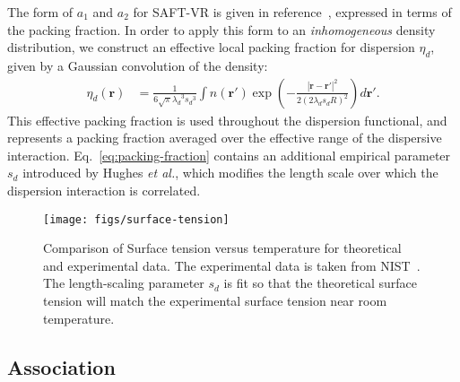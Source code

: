 \documentclass[twocolumn,amsmath,amssymb,prl]{revtex4-1}
\newcommand{\xx}{\textbf{r}}
\newcommand\etadisp{\ensuremath{\eta_\textit{d}}}
\newcommand\lambdadisp{\ensuremath{\lambda_\textit{d}}}
\newcommand\lscale{\ensuremath{s_d}}
\newcommand\hughesetal{Hughes \emph{et al.}}
\begin{document}
The form of $a_1$ and $a_2$ for SAFT-VR is given in
reference~\cite{gil-villegas-1997-SAFT-VR}, expressed in terms
of the packing fraction.  In order to apply this form to an
\emph{inhomogeneous} density distribution, we construct an effective local
packing fraction for dispersion $\etadisp$, given by a Gaussian
convolution of the density:
\begin{align}
  \etadisp(\xx) &= \frac{1}{6\sqrt{\pi} \lambdadisp^3\lscale^3}
  \int n(\xx')\exp\left({-\frac{|\xx-\xx'|^2}{2(2 \lambdadisp
      \lscale R)^2}}\right)d\xx'.\label{eq:packing-fraction}
\end{align}
This effective packing fraction is used throughout the dispersion
functional, and represents a packing fraction averaged over the
effective range of the dispersive interaction.
Eq.~\ref{eq:packing-fraction} contains an additional empirical
parameter $\lscale$ introduced by \hughesetal, which modifies the
length scale over which the dispersion interaction is correlated.

\begin{figure}
\begin{center}
\texttt{[image: figs/surface-tension]}
\end{center}
\caption{Comparison of Surface tension versus temperature for
  theoretical and experimental data. The experimental data is taken
  from NIST~\cite{nistwater}.  The length-scaling parameter $\lscale$
  is fit so that the theoretical surface tension will match the
  experimental surface tension near room temperature.}
\label{fig:surface-tension}
\end{figure}

\subsection{Association}
\end{document}

